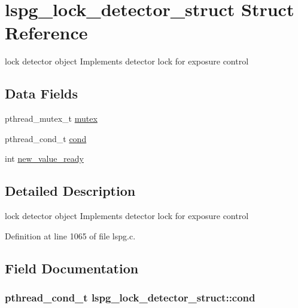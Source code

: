 \hypertarget{structlspg__lock__detector__struct}{\section{lspg\-\_\-lock\-\_\-detector\-\_\-struct Struct Reference}
\label{structlspg__lock__detector__struct}
}


lock detector object Implements detector lock for exposure control  


\subsection*{Data Fields}
\begin{DoxyCompactItemize}
\item 
pthread\-\_\-mutex\-\_\-t \hyperlink{structlspg__lock__detector__struct_ab5ab5534b376a8fbafdd0b54cec4483c}{mutex}
\item 
pthread\-\_\-cond\-\_\-t \hyperlink{structlspg__lock__detector__struct_adc90c859665dccc8717219e824cba0b8}{cond}
\item 
int \hyperlink{structlspg__lock__detector__struct_a62373414b815fe178edd8522b3bd4d78}{new\-\_\-value\-\_\-ready}
\end{DoxyCompactItemize}


\subsection{Detailed Description}
lock detector object Implements detector lock for exposure control 

Definition at line 1065 of file lspg.\-c.



\subsection{Field Documentation}
\hypertarget{structlspg__lock__detector__struct_adc90c859665dccc8717219e824cba0b8}{
\subsubsection[{cond}]{\setlength{\rightskip}{0pt plus 5cm}pthread\-\_\-cond\-\_\-t lspg\-\_\-lock\-\_\-detector\-\_\-struct\-::cond}}\label{structlspg__lock__detector__struct_adc90c859665dccc8717219e824cba0b8}


